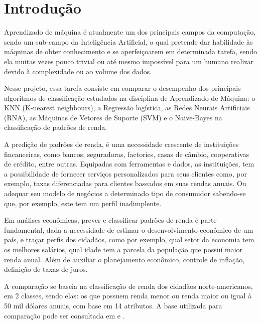 \section{Introdução}
Aprendizado de máquina é atualmente um dos principais campos da computação, sendo um sub-campo da Inteligência Artificial, o qual pretende dar habilidade às máquinas de obter conhecimento e se aperfeiçoarem em determinada tarefa, sendo ela muitas vezes pouco trivial ou até mesmo impossível para um humano realizar devido à complexidade ou ao volume dos dados.

Nesse projeto, essa tarefa consiste em comparar o desempenho dos principais algoritmos de classificação estudados na disciplina de Aprendizado de Máquina: o KNN (K-nearest neighbours), a Regressão logística, as Redes Neurais Artificiais (RNA), as Máquinas de Vetores de Suporte (SVM) e o Naive-Bayes na classificação de padrões de renda. \cite{trabalho}

A predição de padrões de renda, é uma necessidade crescente de instituições fincanceiras, como bancos, seguradoras, factories, casas de câmbio, cooperativas de crédito, entre outras. Equipadas com ferramentas e dados, as instituições, tem a possibilidade de fornecer serviços personalizados para seus clientes como, por exemplo, taxas diferenciadas para clientes baseados em suas rendas anuais. Ou adequar seu modelo de negócios a determinado  tipo de consumidor sabendo-se que, por exemplo, este tem um perfil inadimplente.\cite{importance}

Em análises econômicas, prever e classificar padrões de renda é parte fundamental, dada a necessidade de estimar o desenvolvimento econômico de um país, e traçar perfis dos cidadãos, como por exemplo, qual setor da economia tem os melhores salários, qual idade tem a parcela da população que possuí maior renda anual. Além de auxiliar o planejamento econômico, controle de inflação, definição de taxas de juros.\cite{importance2}

A comparação se baseia na classificação de renda dos cidadãos norte-americanos, em 2 classes, sendo elas: os que possuem renda menor ou renda maior ou igual à 50 mil dólares anuais, com base em 14 atributos. A base utilizada para comparação pode ser consultada em \cite{base} e \cite{base2}.